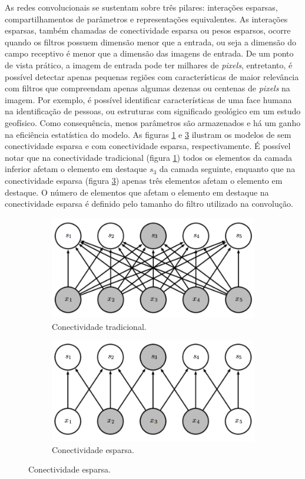 As redes convolucionais se sustentam sobre três pilares: interações esparsas, compartilhamentos
de parâmetros e representações equivalentes. 
As interações esparsas, também chamadas de conectividade esparsa ou pesos esparsos,
ocorre quando os filtros possuem  dimensão menor que a entrada, ou seja a
dimensão do campo receptivo é menor que a dimensão das imagens de entrada.
De um ponto de vista prático,
a imagem de entrada pode ter milhares de \textit{pixels}, entretanto, é 
possível detectar apenas pequenas regiões com características de maior relevância
com filtros que compreendam apenas algumas dezenas ou centenas de \textit{pixels} na imagem.
Por exemplo, é possível identificar características de uma face humana na identificação de pessoas, ou estruturas com
significado geológico em um estudo geofísico. Como consequência,
menos parâmetros são armazenados e há um ganho na eficiência estatística do
modelo. As figuras \ref{fig:full} e \ref{fig:sparse} ilustram
os modelos de sem conectividade esparsa e com conectividade esparsa, respectivamente.
É possível notar que na conectividade tradicional (figura \ref{fig:full}) todos os elementos da camada inferior
afetam o elemento em destaque $s_3$ da camada seguinte, enquanto que na conectividade esparsa (figura \ref{fig:sparse}) apenas
três elementos afetam o elemento em destaque. O número de elementos que afetam o elemento em destaque na
conectividade esparsa é definido pelo tamanho do filtro utilizado na convolução.

\begin{figure}[htp]
\begin{subfigure}{.5\textwidth}
  \centering
  \includegraphics[width=.9\linewidth]{fig/full}
  \caption{Conectividade tradicional.}
  \label{fig:full}
\end{subfigure}%
\begin{subfigure}{.5\textwidth}
  \centering
  \includegraphics[width=.9\linewidth]{fig/sparse}
  \caption{Conectividade esparsa.}
  \label{fig:sparse}
\end{subfigure}
\end{figure}

